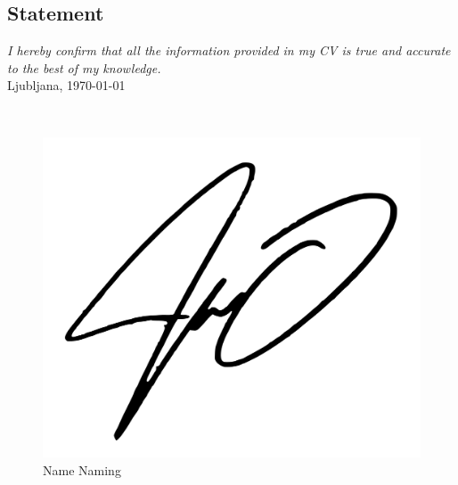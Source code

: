 \documentclass[%
               doublesided,
               paper=a4,
               fontsize=10pt
              ]{my-resume}
\begin{document}
{        \subsection{Statement }
        \textit{I hereby confirm that all the information provided in my CV is true and accurate to the best of my knowledge.}\\


        Ljubljana, \today
        
        \textcolor{white}{.}
        \begin{figure} 
            \centering
            \includegraphics[width=\linewidth]{signature.png}
            \caption{Name Naming}
        \end{figure}  
    
    }
    \makebody
\end{document}
